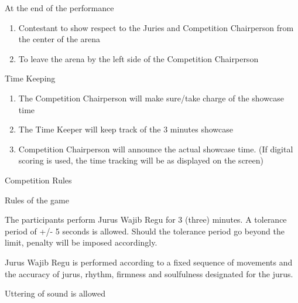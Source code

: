\begin{legal}
\begin{legal}
    \item At the end of the performance
        \begin{enumerate}[label=\alph*.]
        \item Contestant to show respect to the Juries and Competition Chairperson from the center of the arena
        \item To leave the arena by the left side of the Competition Chairperson
        \end{enumerate}

    \item Time Keeping
        \begin{enumerate}[label=\alph*.]
        \item The Competition Chairperson will make sure/take charge of the showcase time
        \item The Time Keeper will keep track of the 3 minutes showcase
        \item Competition Chairperson will announce the actual showcase time. (If digital scoring is used, 
              the time tracking will be as displayed on the screen)
        \end{enumerate}

    \end{legal} %

\item Competition Rules
    \begin{legal}
    \item Rules of the game
        \begin{legal}
        \item The participants perform Jurus Wajib Regu for 3 (three) minutes. 
            A tolerance period of +/- 5 seconds is allowed.  Should the tolerance period go beyond the limit, 
            penalty will be imposed accordingly.
        \item Jurus Wajib Regu is performed according to a fixed sequence of movements and the accuracy of jurus, 
            rhythm, firmness and soulfulness designated for the jurus.
        \item Uttering of sound is allowed
        \end{legal}


\end{legal}
\end{legal}
